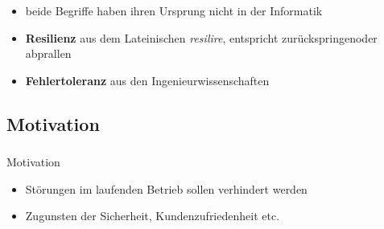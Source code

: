 \begin{frame}
    \frametitle{\insertsection}
    \framesubtitle{\insertsubsection}

        \begin{itemize}
            \item beide Begriffe haben ihren Ursprung nicht in der Informatik
            \item \textbf{Resilienz} aus dem Lateinischen \textit{resilire}, entspricht \glqq zurückspringen\grqq oder  \glqq abprallen\grqq
            \item \textbf{Fehlertoleranz} aus den Ingenieurwissenschaften
        \end{itemize}
\end{frame}

\subsection{Motivation}

\begin{frame}
    \frametitle{\insertsection}
    \framesubtitle{\insertsubsection}

    \begin{block}{Motivation}
        \begin{itemize}
            \item Störungen im laufenden Betrieb sollen verhindert werden
            \item Zugunsten der Sicherheit, Kundenzufriedenheit etc.
        \end{itemize}
    \end{block}
\end{frame}

%

